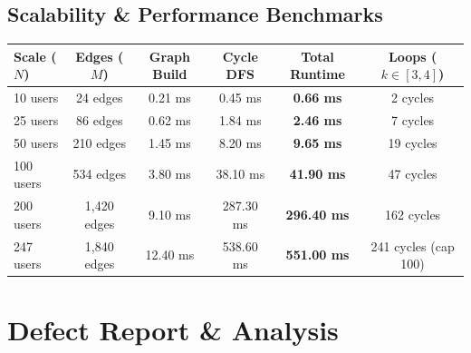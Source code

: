 \documentclass[12pt,a4paper]{report}
\begin{document}
\section{Scalability \& Performance Benchmarks}
\begin{table}[ht]
\centering
\begin{tabularx}{\textwidth}{l c c c c c}
\toprule
\textbf{Scale ($N$)} & \textbf{Edges ($M$)} & \textbf{Graph Build} & \textbf{Cycle DFS} & \textbf{Total Runtime} & \textbf{Loops ($k \in [3,4]$)} \\
\midrule
10 users & 24 edges & 0.21 ms & 0.45 ms & \textbf{0.66 ms} & 2 cycles \\
25 users & 86 edges & 0.62 ms & 1.84 ms & \textbf{2.46 ms} & 7 cycles \\
50 users & 210 edges & 1.45 ms & 8.20 ms & \textbf{9.65 ms} & 19 cycles \\
100 users & 534 edges & 3.80 ms & 38.10 ms & \textbf{41.90 ms} & 47 cycles \\
200 users & 1,420 edges & 9.10 ms & 287.30 ms & \textbf{296.40 ms} & 162 cycles \\
247 users & 1,840 edges & 12.40 ms & 538.60 ms & \textbf{551.00 ms} & 241 cycles (cap 100) \\
\bottomrule
\end{tabularx}
\end{table}

\newpage

\chapter{Defect Report \& Analysis}
\end{document}
